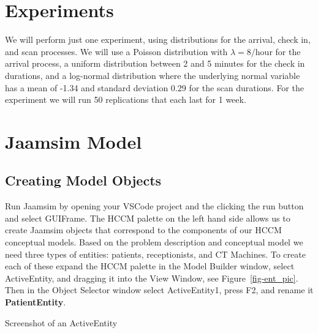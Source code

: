 \documentclass[
  10pt,
  a4paperpaper,
  DIV=11,
  numbers=noendperiod,
  oneside]{scrreprt}
\begin{document}
\section{Experiments}\label{experiments}

We will perform just one experiment, using distributions for the
arrival, check in, and scan processes. We will use a Poisson
distribution with \(\lambda=8/\text{hour}\) for the arrival process, a
uniform distribution between 2 and 5 minutes for the check in durations,
and a log-normal distribution where the underlying normal variable has a
mean of -1.34 and standard deviation 0.29 for the scan durations. For
the experiment we will run 50 replications that each last for 1 week.

\section{Jaamsim Model}\label{jaamsim-model}

\subsection{Creating Model Objects}\label{creating-model-objects}

Run Jaamsim by opening your VSCode project and the clicking the run
button and select GUIFrame. The HCCM palette on the left hand side
allows us to create Jaamsim objects that correspond to the components of
our HCCM conceptual models. Based on the problem description and
conceptual model we need three types of entities: patients,
receptionists, and CT Machines. To create each of these expand the HCCM
palette in the Model Builder window, select ActiveEntity, and dragging
it into the View Window, see Figure~\ref{fig-ent_pic}. Then in the
Object Selector window select ActiveEntity1, press F2, and rename it
\textbf{PatientEntity}.

\begin{marginfigure}


\caption{\label{fig-ent_pic}Screenshot of an ActiveEntity}

\end{marginfigure}%
\end{document}
